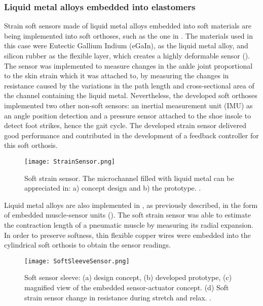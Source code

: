 \subsubsection{Liquid metal alloys embedded into elastomers}

Strain soft sensors made of liquid metal alloys embedded into soft materials are being implemented into soft orthoses, such as the one in \cite{park2011bio}. The materials used in this case were Eutectic Gallium Indium (eGaIn), as the liquid metal alloy, and silicon rubber as the flexible layer, which creates a highly deformable sensor (). The sensor was implemented to measure changes in the ankle joint proportional to the skin strain which it was attached to, by measuring the changes in resistance caused by the variations in the path length and cross-sectional area of the channel containing the liquid metal. Nevertheless, the developed soft orthoses implemented two other non-soft sensors: an inertial measurement unit (IMU) as an angle position detection and a pressure sensor attached to the shoe insole to detect foot strikes, hence the gait cycle. The developed strain sensor delivered good performance and contributed in the development of a feedback controller for this soft orthosis.

\begin{figure}[hbtp!]
    \centering
    \texttt{[image: StrainSensor.png]}
    \caption{Soft strain sensor. The microchannel filled with liquid metal can be appreciated in: a) concept design and b) the prototype. \cite{park2011bio}. }
    \label{fig:strain_sensor}
\end{figure}

Liquid metal alloys are also implemented in \cite{Park2012}, as previously described, in the form of embedded muscle-sensor units (). The soft strain sensor was able to estimate the contraction length of a pneumatic muscle by measuring its radial expansion. In order to preserve softness, thin flexible copper wires were embedded into the cylindrical soft orthosis to obtain the sensor readings.

\begin{figure}[hbtp!]
    \centering
    \texttt{[image: SoftSleeveSensor.png]}
    \caption{Soft sensor sleeve: (a) design concept, (b) developed prototype, (c) magnified view of the embedded sensor-actuator concept. (d) Soft strain sensor change in resistance during stretch and relax. \cite{Park2012}. }
    \label{fig:soft_sleeve_sensor}
\end{figure}

